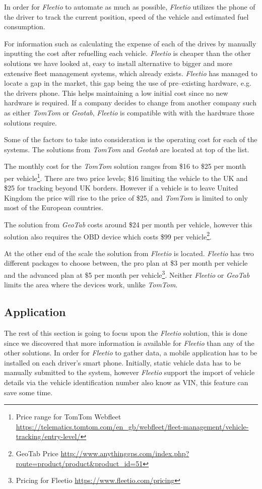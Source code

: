 In order for \textit{Fleetio} to automate as much as possible, \textit{Fleetio} utilizes the phone of the driver to track the current position, speed of the vehicle and estimated fuel consumption.

For information such as calculating the expense of each of the drives by manually inputting the cost after refuelling each vehicle.
\textit{Fleetio} is cheaper than the other solutions we have looked at, easy to install alternative to bigger and more extensive fleet management systems, which already exists.
\textit{Fleetio} has managed to locate a gap in the market, this gap being the use of pre--existing hardware, e.g. the drivers phone.
This helps maintaining a low initial cost since no new hardware is required.
If a company decides to change from another company such as either \textit{TomTom} or \textit{Geotab}, \textit{Fleetio} is compatible with with the hardware those solutions require.

Some of the factors to take into consideration is the operating cost for each of the systems.
The solutions from \textit{TomTom} and \textit{Geotab} are located at top of the list.

The monthly cost for the \textit{TomTom} solution ranges from \$16 to \$25 per month per vehicle\footnote{Price range for TomTom Webfleet\\ \url{https://telematics.tomtom.com/en_gb/webfleet/fleet-management/vehicle-tracking/entry-level/}}.
There are two price levels; \$16 limiting the vehicle to the UK and \$25 for tracking beyond UK borders.
However if a vehicle is to leave United Kingdom the price will rise to the price of \$25, and \textit{TomTom} is limited to only most of the European countries.

The solution from \textit{GeoTab} costs around \$24 per month per vehicle, however this solution also requires the OBD device which costs \$99 per vehicle\footnote{GeoTab Price \url{http://www.anythinggps.com/index.php?route=product/product&product_id=51}}.

At the other end of the scale the solution from \textit{Fleetio} is located.
\textit{Fleetio} has two different packages to choose between, the pro plan at \$3 per month per vehicle and the advanced plan at \$5 per month per vehicle\footnote{Pricing for Fleetio \url{https://www.fleetio.com/pricing}}.
Neither \textit{Fleetio} or \textit{GeoTab} limits the area where the devices work, unlike \textit{TomTom}.

\subsection{Application}\label{sub:Application}
The rest of this section is going to focus upon the \textit{Fleetio} solution, this is done since we discovered that more information is available for \textit{Fleetio} than any of the other solutions.
In order for \textit{Fleetio} to gather data, a mobile application has to be installed on each driver's smart phone.
Initially, static vehicle data has to be manually submitted to the system, however \textit{Fleetio} support the import of vehicle details via the vehicle identification number also know as VIN, this feature can save some time.

